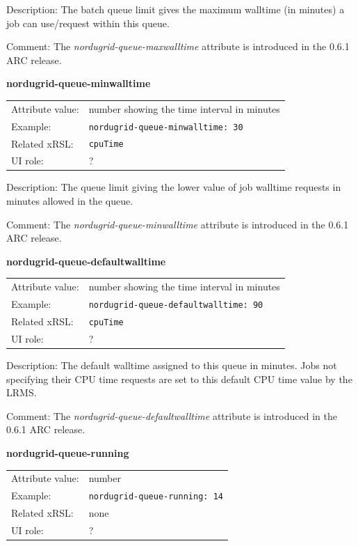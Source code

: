 \documentclass{article}
\begin{document}
Description: The batch queue limit gives the maximum  walltime (in minutes) a job 
can use/request within this queue.

Comment: The {\it nordugrid-queue-maxwalltime} attribute is introduced
in the 0.6.1 ARC release.

  \hspace*{0.5cm}
  \begin{shaded}
    \textbf{nordugrid-queue-minwalltime}
  \end{shaded}
  \begin{tabular}{lp{10cm}}  
    Attribute value:& number showing the time interval in minutes\\
    Example:& \verb#nordugrid-queue-minwalltime: 30#\\
    Related xRSL:& \verb#cpuTime#\\
    UI role:& ?\\ 
  \end{tabular}

Description: The queue limit giving the lower value of 
job walltime requests in minutes allowed in the queue.

Comment: The {\it nordugrid-queue-minwalltime} attribute is introduced
in the 0.6.1 ARC release.

  \hspace*{0.5cm}
  \begin{shaded}
    \textbf{nordugrid-queue-defaultwalltime}
  \end{shaded}
  \begin{tabular}{lp{10cm}}  
    Attribute value:& number showing the time interval in minutes\\
    Example:& \verb#nordugrid-queue-defaultwalltime: 90#\\
    Related xRSL:& \verb#cpuTime#\\
    UI role:& ?\\
  \end{tabular}

Description: The default  walltime assigned to this queue in minutes.
Jobs not specifying their CPU time requests are set to this default
CPU time value by the LRMS.

Comment: The {\it nordugrid-queue-defaultwalltime } attribute is introduced
in the 0.6.1 ARC release.

  \hspace*{0.5cm}
  \begin{shaded}
    \textbf{nordugrid-queue-running}
  \end{shaded}
  \begin{tabular}{lp{10cm}}  
    Attribute value:& number\\
    Example:& \verb#nordugrid-queue-running: 14#\\
    Related xRSL:& none\\
    UI role:& ?\\ 
  \end{tabular}
\end{document}
